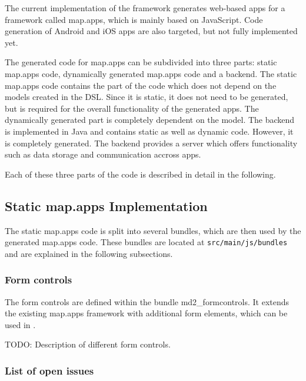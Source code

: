 
The current implementation of the \MD framework generates web-based apps for a framework called map.apps, which is mainly based on JavaScript. Code generation of Android and iOS apps are also targeted, but not fully implemented yet.

The generated code for map.apps can be subdivided into three parts: static map.apps code, dynamically generated map.apps code and a backend. The static map.apps code contains the part of the code which does not depend on the models created in the \MD DSL. Since it is static, it does not need to be generated, but is required for the overall functionality of the generated apps. The dynamically generated part is completely dependent on the model. The backend is implemented in Java and contains static as well as dynamic code. However, it is completely generated. The backend provides a server which offers functionality such as data storage and communication accross apps.

Each of these three parts of the code is described in detail in the following.


\subsection{Static map.apps Implementation}

The static map.apps code is split into several bundles, which are then used by the generated map.apps code. These bundles are located at \texttt{src/main/js/bundles} and are explained in the following subsections.

\subsubsection{Form controls}

The form controls are defined within the bundle md2\_formcontrols. It extends the existing map.apps framework with additional form elements, which can be used in \MD. 

TODO: Description of different form controls.

\subsubsection{List of open issues}

